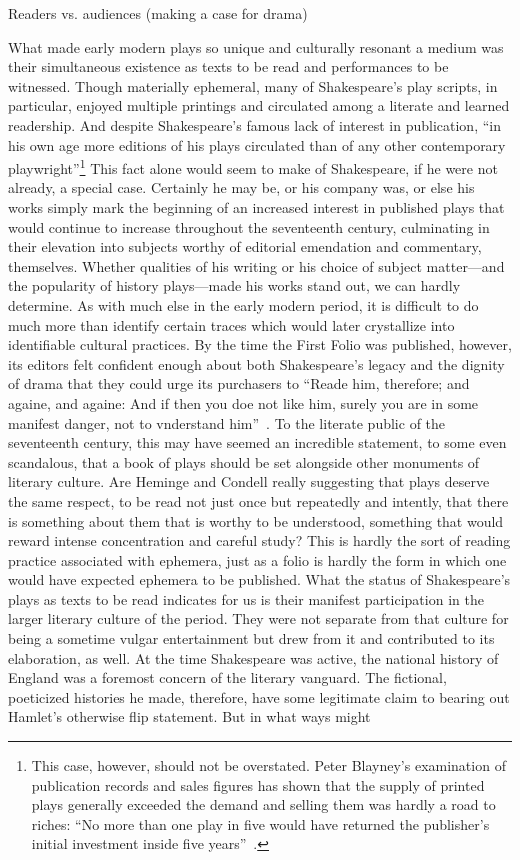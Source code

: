 Readers vs. audiences (making a case for drama)

What made early modern plays so unique and culturally resonant a medium was their simultaneous existence as texts to be read and performances to be witnessed. Though materially ephemeral, many of Shakespeare's play scripts, in particular, enjoyed multiple printings and circulated among a literate and learned readership. And despite Shakespeare's famous lack of interest in publication, ``in his own age more editions of his plays circulated than of any other contemporary playwright''\cite[21]{kastan_shakespeare_2001}\footnote{This case, however, should not be overstated. Peter Blayney's examination of publication records and sales figures has shown that the supply of printed plays generally exceeded the demand and selling them was hardly a road to riches: ``No more than one play in five would have returned the publisher's initial investment inside five years''~\cite[383--422]{blayney_publication_1997}.} This fact alone would seem to make of Shakespeare, if he were not already, a special case. Certainly he may be, or his company was, or else his works simply mark the beginning of an increased interest in published plays that would continue to increase throughout the seventeenth century, culminating in their elevation into subjects worthy of editorial emendation and commentary, themselves. Whether qualities of his writing or his choice of subject matter---and the popularity of history plays---made his works stand out, we can hardly determine. As with much else in the early modern period, it is difficult to do much more than identify certain traces which would later crystallize into identifiable cultural practices. By the time the First Folio was published, however, its editors felt confident enough about both Shakespeare's legacy and the dignity of drama that they could urge its purchasers to ``Reade him, therefore; and againe, and againe: And if then you doe not like him, surely you are in some manifest danger, not to vnderstand him''~\cite[sig. A3r]{heminge_great_1623}. To the literate public of the seventeenth century, this may have seemed an incredible statement, to some even scandalous, that a book of plays should be set alongside other monuments of literary culture. Are Heminge and Condell really suggesting that plays deserve the same respect, to be read not just once but repeatedly and intently, that there is something about them that is worthy to be understood, something that would reward intense concentration and careful study? This is hardly the sort of reading practice associated with ephemera, just as a folio is hardly the form in which one would have expected ephemera to be published. What the status of Shakespeare's plays as texts to be read indicates for us is their manifest participation in the larger literary culture of the period. They were not separate from that culture for being a sometime vulgar entertainment but drew from it and contributed to its elaboration, as well. At the time Shakespeare was active, the national history of England was a foremost concern of the literary vanguard. The fictional, poeticized histories he made, therefore, have some legitimate claim to bearing out Hamlet's otherwise flip statement. But in what ways might 